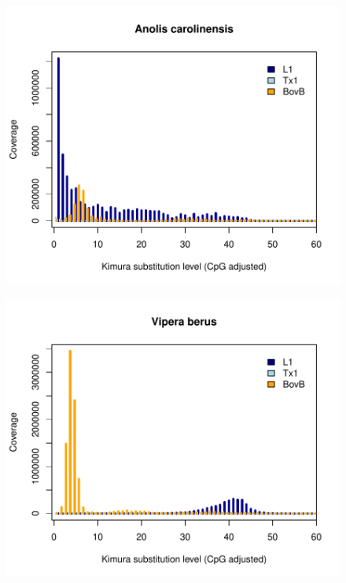 \documentclass[12pt,a4paper,times]{article}
\begin{document}
\begin{figure}[H]
	\centering
	\includegraphics[scale=0.8]{suppFigures/divergencePlots/Anolis_carolinensis.pdf}
	\caption{\label{fig:Anolis_carolinensis}}
\end{figure}

\begin{figure}[H]
	\centering
	\includegraphics[scale=0.8]{suppFigures/divergencePlots/Vipera_berus.pdf}
	\caption{\label{Vipera_berus}}
\end{figure}
\end{document}
